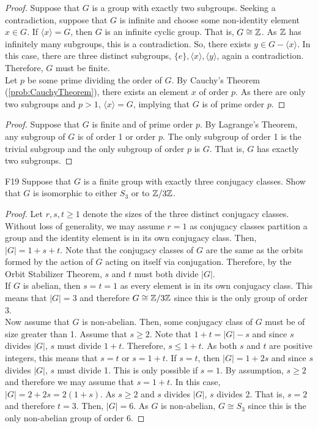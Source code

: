 \documentclass[../AlgebraQualSolutions.tex]{subfiles}
\begin{document}
	\begin{proof}
	Suppose that $G$ is a group with exactly two subgroups. Seeking a contradiction, suppose that $G$ is infinite and choose some non-identity element $x \in G$. If $\langle x \rangle = G$, then $G$ is an infinite cyclic group. That is, $G \cong \mathbb{Z}$. As $\mathbb{Z}$ has infinitely many subgroups, this is a contradiction. So, there exists $y \in G - \langle x \rangle$. In this case, there are three distinct subgroups, $\{e\}, \langle x \rangle, \langle y \rangle$, again a contradiction. Therefore, $G$ must be finite.\\
	
	Let $p$ be some prime dividing the order of $G$. By Cauchy's Theorem (\ref{prob:CauchyTheorem}), there exists an element $x$ of order $p$. As there are only two subgroups and $p > 1$, $\langle x \rangle = G$, implying that $G$ is of prime order $p$.
	\end{proof}
	
	\begin{proof}
	Suppose that $G$ is finite and of prime order $p$. By Lagrange's Theorem, any subgroup of $G$ is of order 1 or order $p$. The only subgroup of order 1 is the trivial subgroup and the only subgroup of order $p$ is $G$. That is, $G$ has exactly two subgroups.
	\end{proof}
	
	\begin{prob}{F19}{}
	Suppose that $G$ is a finite group with exactly three conjugacy classes. Show that $G$ is isomorphic to either $S_3$ or to $\mathbb{Z}/3\mathbb{Z}$.
	\end{prob}
	
	\begin{proof}
	Let $r,s,t \geq 1$ denote the sizes of the three distinct conjugacy classes. Without loss of generality, we may assume $r = 1$ as conjugacy classes partition a group and the identity element is in its own conjugacy class. Then, $|G| = 1 + s + t$. Note that the conjugacy classes of $G$ are the same as the orbits formed by the action of $G$ acting on itself via conjugation. Therefore, by the Orbit Stabilizer Theorem, $s$ and $t$ must both divide $|G|$.\\
	
	If $G$ is abelian, then $s = t =1$ as every element is in its own conjugacy class. This means that $|G| = 3$ and therefore $G \cong \mathbb{Z}/3\mathbb{Z}$ since this is the only group of order 3.\\
	
	Now assume that $G$ is non-abelian. Then, some conjugacy class of $G$ must be of size greater than 1. Assume that $s \geq 2$. Note that $1 + t = |G| -s$ and since $s$ divides $|G|$, $s$ must divide $1 + t$. Therefore, $s \leq 1 + t$. As both $s$ and $t$ are positive integers, this means that $s = t$ or $s = 1 + t$. If $s = t$, then $|G| = 1 + 2s$ and since $s$ divides $|G|$, $s$ must divide 1. This is only possible if $s = 1$. By assumption, $s \geq 2$ and therefore we may assume that $s = 1 + t$. In this case, $|G| = 2 + 2s = 2(1 + s)$. As $s \geq 2$ and $s$ divides $|G|$, $s$ divides 2. That is, $s = 2$ and therefore $t = 3$. Then, $|G| = 6$. As $G$ is non-abelian, $G \cong S_3$ since this is the only non-abelian group of order 6.
	\end{proof}
	
\end{document}

